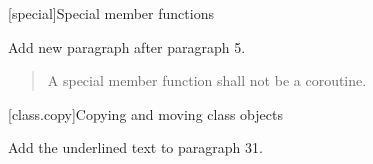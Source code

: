 
\setcounter{chapter}{11}
[special]{Special member functions}

Add new paragraph after paragraph 5.

\begin{quote}
	\setcounter{Paras}{5}
	\pnum
	A special member function shall not be a coroutine.
\end{quote}

\setcounter{section}{7}
[class.copy]{Copying and moving class objects}%


Add the underlined text to paragraph 31.

\begin{quote}
\setcounter{Paras}{31}


\end{quote}
